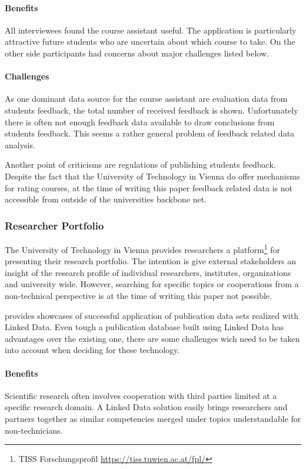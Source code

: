 \documentclass{article}
\begin{document}
\paragraph{Benefits}
All interviewees found the course assistant useful. The application is particularly attractive future students who are uncertain about which course to take. On the other side participants had concerns about major challenges listed below.  
\paragraph{Challenges}
As one dominant data source for the course assistant are evaluation data from students feedback, the total number of received feedback is shown. Unfortunately there is often not enough feedback data available to draw conclusions from students feedback. This seems a rather general problem of feedback related data analysis. 

Another point of criticisms are regulations of publishing students feedback. Despite the fact that the University of Technology in Vienna do offer mechanisms for rating courses, at the time of writing this paper feedback related data is not accessible from outside of the universities backbone net. 
\subsubsection{Researcher Portfolio}
The University of Technology in Vienna provides researchers a platform\footnote{TISS Forschungsprofil \url{https://tiss.tuwien.ac.at/fpl/}} for presenting their research portfolio. The intention is give external stakeholders an insight of the research profile of individual researchers, institutes, organizations and university wide. However, searching for specific topics or cooperations from a non-technical perspective is at the time of writing this paper not possible. 

\citet{article:publication-database-linked-data} provides showcases of successful application of publication data sets realized with Linked Data. Even tough a publication database built using Linked Data has advantages over the existing one, there are some challenges wich need to be taken into account when deciding for these technology. 
\paragraph{Benefits}
Scientific research often involves cooperation with third parties limited at a specific research domain. A Linked Data solution easily brings researchers and partners together as similar competencies merged under topics understandable for non-technicians. 
\end{document}
